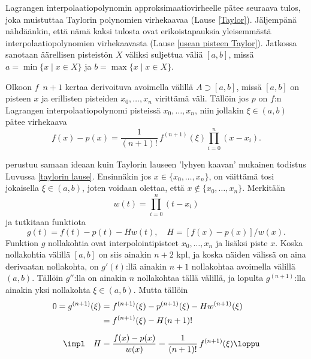Lagrangen interpolaatiopolynomin approksimaatiovirheelle pätee seuraava tulos, joka muistuttaa 
Taylorin polynomien virhekaavaa (Lause \ref{Taylor}). Jäljempänä nähdäänkin, että nämä kaksi
tulosta ovat erikoistapauksia yleisemmästä interpolaatiopolynomien virhekaavasta 
(Lause \ref{usean pisteen Taylor}). Jatkossa sanotaan äärellisen pisteistön $X$ 
 väliksi suljettua väliä $[a,b]$, missä $a = \min \{x \mid x \in X\}$ ja 
$b = \max \{x \mid x \in X\}$.
\begin{Lause} \label{Lagrangen interpolaatiovirhe}
Olkoon $f\,$ $n+1$ kertaa derivoituva avoimella välillä $A\supset[a,b]$, missä $[a,b]$ on
pisteen $x$ ja erillisten pisteiden $x_0,\ldots,x_n$ virittämä väli. Tällöin jos $p$ on $f$:n
Lagrangen interpolaatiopolynomi pisteissä $x_0,\ldots,x_n$, niin jollakin $\xi \in (a,b)$
pätee virhekaava
\[
f(x)-p(x)=\frac{1}{(n+1)!}\,f^{(n+1)}(\xi) \prod_{i=0}^n (x-x_i).
\]
\end{Lause}
\tod perustuu samaan ideaan kuin Taylorin lauseen 'lyhyen kaavan' mukainen todistus Luvussa 
\ref{taylorin lause}. Ensinnäkin jos $x\in\{x_0,\ldots,x_n\}$, on väittämä tosi jokaisella 
$\xi \in (a,b)$, joten voidaan olettaa, että $x\notin\{x_0,\ldots,x_n\}$. Merkitään
\[
w(t)=\prod_{i=0}^n (t-x_i)
\]
ja tutkitaan funktiota
\[
g(t)=f(t)-p(t)- Hw(t),\quad H=[f(x)-p(x)]/w(x).
\]
Funktion $g$ nollakohtia ovat interpolointipisteet $x_0,\ldots,x_n$ ja lisäksi piste $x$. Koska
nollakohtia välillä $[a,b]$ on siis ainakin $n+2$ kpl, ja koska näiden välissä on aina 
derivaatan nollakohta, on $g'(t)$:llä ainakin $n+1$ nollakohtaa avoimella välillä $(a,b)$. 
Tällöin $g''$:lla on ainakin $n$ nollakohtaa tällä välillä, ja lopulta $g^{(n+1)}$:lla ainakin
yksi nollakohta $\xi\in (a,b)$. Mutta tällöin
\begin{align*}
0 = g^{(n+1)}(\xi) &= f^{(n+1)}(\xi)-p^{(n+1)}(\xi)-H w^{(n+1)}(\xi) \\
                   &= f^{(n+1)}(\xi)-H (n+1)! \\[2mm]
      \impl\quad H &= \frac{f(x)-p(x)}{w(x)}=\frac{1}{(n+1)!}\,f^{(n+1)}(\xi) \loppu
\end{align*}

